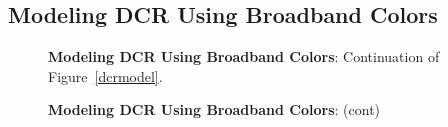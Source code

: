\documentclass[DM,toc]{lsstdoc}
\begin{document}
\subsection{Modeling DCR Using Broadband Colors \label{appx:dcrmodel}}
\begin{figure}[h]
    \centering
    \caption[]{\textbf{Modeling DCR Using Broadband Colors}: Continuation of Figure~\ref{dcrmodel}.}
    \label{dcrmodel2}
\end{figure}
\begin{figure}
    \ContinuedFloat
    \centering
    \caption[]{\textbf{Modeling DCR Using Broadband Colors}: (cont)}
    \label{dcrmodel2}
\end{figure}
\end{document}
